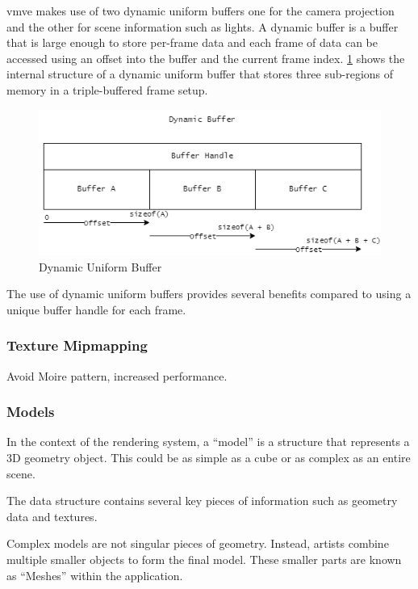 \documentclass[11pt]{article}
\begin{document}
\gls{vmve} makes use of two dynamic uniform buffers one for the camera
projection and the other for scene information such as lights. A dynamic buffer
is a buffer that is large enough to store per-frame data and each frame of data
can be accessed using an offset into the buffer and the current frame index.
\ref{fig:dynamic_uniform_buffer} shows the internal structure of a dynamic
uniform buffer that stores three sub-regions of memory in a triple-buffered
frame setup.

\begin{figure}[h!]
  \centering
  \includegraphics[width=\textwidth]{images/dynamic_buffer.png}
  \caption{Dynamic Uniform Buffer}
  \label{fig:dynamic_uniform_buffer}
\end{figure}

The use of dynamic uniform buffers provides several benefits compared to using a
unique buffer handle for each frame.

\subsubsection{Texture Mipmapping}
Avoid Moire pattern, increased performance.

\subsubsection{Models}
In the context of the rendering system, a ``model'' is a structure that
represents a 3D geometry object. This could be as simple as a cube or as complex
as an entire scene.

The data structure contains several key pieces of information such as geometry
data and textures. 

Complex models are not singular pieces of geometry. Instead, artists combine
multiple smaller objects to form the final model. These smaller parts are known
as ``Meshes'' within the application.
\end{document}
